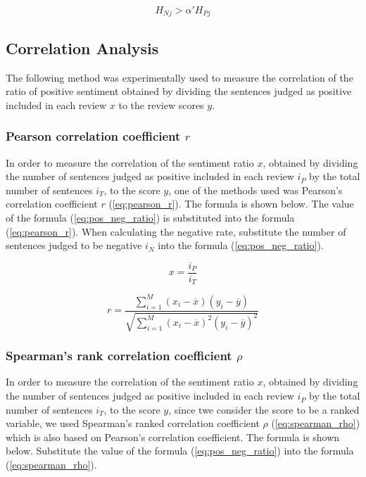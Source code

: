 \documentclass[review]{elsarticle}
\begin{document}
\begin{equation}\label{eq:entropy_neg}
H_{Nj} > \alpha' H_{Pj}
\end{equation}

\subsection{Correlation Analysis}\label{correlation}

The following method was experimentally used to measure the correlation of the ratio of positive sentiment obtained by dividing the sentences judged as positive included in each review \(x\) to the review scores \(y\).

\subsubsection{Pearson correlation coefficient \(r\)}\label{correl_pearson}

In order to measure the correlation of the sentiment ratio \(x\), obtained by dividing the number of sentences judged as positive included in each review \(i_P\) by the total number of sentences \(i_T\), to the score \(y\), one of the methods used was Pearson's correlation coefficient \(r\) (\ref{eq:pearson_r}). The formula is shown below. The value of the formula (\ref{eq:pos_neg_ratio}) is substituted into the formula (\ref{eq:pearson_r}). When calculating the negative rate, substitute the number of sentences judged to be negative \(i_N\) into the formula (\ref{eq:pos_neg_ratio}).

\begin{equation}\label{eq:pos_neg_ratio}
x = \frac{i_P}{i_T}
\end{equation}

\begin{equation}\label{eq:pearson_r}
r = \frac{{}\sum_{i=1}^{M} (x_i - \overline{x})(y_i - \overline{y})}
{\sqrt{\sum_{i=1}^{M} (x_i - \overline{x})^2(y_i - \overline{y})^2}}
\end{equation}

\subsubsection{Spearman's rank correlation coefficient \(\rho\)}\label{correl_spearman}

In order to measure the correlation of the sentiment ratio \(x\), obtained by dividing the number of sentences judged as positive included in each review \(i_P\) by the total number of sentences \(i_T\), to the score \(y\), since twe consider the score to be a ranked variable, we used Spearman's ranked correlation coefficient \(\rho\) (\ref{eq:spearman_rho}) which is also based on Pearson's correlation coefficient. The formula is shown below. Substitute the value of the formula (\ref{eq:pos_neg_ratio}) into the formula (\ref{eq:spearman_rho}).
\end{document}
